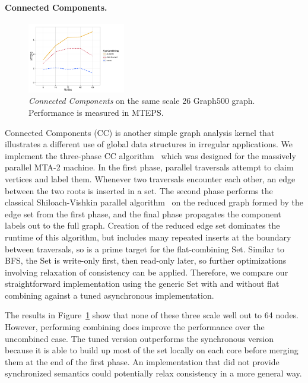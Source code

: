 \paragraph{Connected Components.}
\begin{figure}[t]
  \centering
  \includegraphics[width=0.38\textwidth]{data/plots/cc_perf.pdf}
  \caption{\emph{Connected Components} on the same scale 26 Graph500 graph. Performance is measured in MTEPS.}
  \label{fig:cc_perf}
\end{figure}
Connected Components (CC) is another simple graph analysis kernel that illustrates a different use of global data structures in irregular applications. We implement the three-phase CC algorithm~\cite{mtgl} which was designed for the massively parallel MTA-2 machine. In the first phase, parallel traversals attempt to claim vertices and label them.
Whenever two traversals encounter each other, an edge between the two roots is inserted in a set. 
The second phase performs the classical Shiloach-Vishkin parallel algorithm~\cite{shiloach1982n} on the reduced graph formed by the edge set from the first phase, and the final phase propagates the component labels out to the full graph.
Creation of the reduced edge set dominates the runtime of this algorithm, but includes many repeated inserts at the boundary between traversals, so is a prime target for the flat-combining Set.
Similar to BFS, the Set is write-only first, then read-only later, so further optimizations involving relaxation of consistency can be applied. Therefore, we compare our straightforward implementation using the generic Set with and without flat combining against a tuned asynchronous implementation.

The results in Figure~\ref{fig:cc_perf} show that none of these three scale well out to 64 nodes. However, performing combining does improve the performance over the uncombined case. The tuned version outperforms the synchronous version because it is able to build up most of the set locally on each core before merging them at the end of the first phase. An implementation that did not provide synchronized semantics could potentially relax consistency in a more general way.
